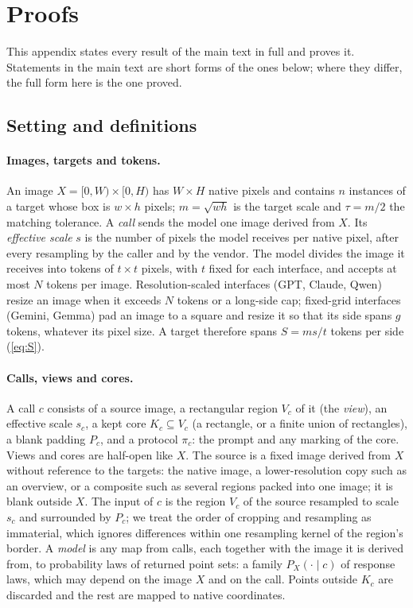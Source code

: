 \section{Proofs}
\label{sec:proofs}

This appendix states every result of the main text in full and proves it. Statements in the main text are short forms of the ones below; where they differ, the full form here is the one proved.

\subsection{Setting and definitions}
\label{sec:defs}

\paragraph{Images, targets and tokens.} An image $X = [0,W) \times [0,H)$ has $W \times H$ native pixels and contains $n$ instances of a target whose box is $w \times h$ pixels; $m = \sqrt{wh}$ is the target scale and $\tau = m/2$ the matching tolerance. A \emph{call} sends the model one image derived from $X$. Its \emph{effective scale} $s$ is the number of pixels the model receives per native pixel, after every resampling by the caller and by the vendor. The model divides the image it receives into tokens of $t \times t$ pixels, with $t$ fixed for each interface, and accepts at most $N$ tokens per image. Resolution-scaled interfaces (GPT, Claude, Qwen) resize an image when it exceeds $N$ tokens or a long-side cap; fixed-grid interfaces (Gemini, Gemma) pad an image to a square and resize it so that its side spans $g$ tokens, whatever its pixel size. A target therefore spans $S = ms/t$ tokens per side (\cref{eq:S}).

\paragraph{Calls, views and cores.} A call $c$ consists of a source image, a rectangular region $V_c$ of it (the \emph{view}), an effective scale $s_c$, a kept core $K_c \subseteq V_c$ (a rectangle, or a finite union of rectangles), a blank padding $P_c$, and a protocol $\pi_c$: the prompt and any marking of the core. Views and cores are half-open like $X$. The source is a fixed image derived from $X$ without reference to the targets: the native image, a lower-resolution copy such as an overview, or a composite such as several regions packed into one image; it is blank outside $X$. The input of $c$ is the region $V_c$ of the source resampled to scale $s_c$ and surrounded by $P_c$; we treat the order of cropping and resampling as immaterial, which ignores differences within one resampling kernel of the region's border. A \emph{model} is any map from calls, each together with the image it is derived from, to probability laws of returned point sets: a family $P_X(\cdot \mid c)$ of response laws, which may depend on the image $X$ and on the call. Points outside $K_c$ are discarded and the rest are mapped to native coordinates.

